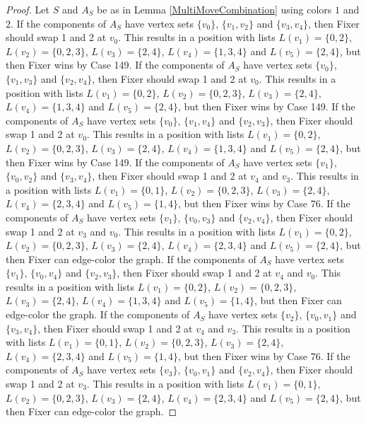 \documentclass[12pt]{amsart}
\theoremstyle{plain}
\theoremstyle{definition}
\theoremstyle{remark}
\begin{document}
\begin{proof}
Let $S$ and $A_S$ be as in Lemma \ref{MultiMoveCombination} using colors $1$ and $2$. If the components of $A_S$ have vertex sets $\{v_0\}$, $\{v_1, v_2\}$ and $\{v_3, v_4\}$, then Fixer should swap 1 and 2 at $v_0$. This results in a position with lists $L(v_1) = \{0, 2\}$, $L(v_2) = \{0, 2, 3\}$, $L(v_3) = \{2, 4\}$, $L(v_4) = \{1, 3, 4\}$ and $L(v_5) = \{2, 4\}$, but then Fixer wins by Case 149.
If the components of $A_S$ have vertex sets $\{v_0\}$, $\{v_1, v_3\}$ and $\{v_2, v_4\}$, then Fixer should swap 1 and 2 at $v_0$. This results in a position with lists $L(v_1) = \{0, 2\}$, $L(v_2) = \{0, 2, 3\}$, $L(v_3) = \{2, 4\}$, $L(v_4) = \{1, 3, 4\}$ and $L(v_5) = \{2, 4\}$, but then Fixer wins by Case 149.
If the components of $A_S$ have vertex sets $\{v_0\}$, $\{v_1, v_4\}$ and $\{v_2, v_3\}$, then Fixer should swap 1 and 2 at $v_0$. This results in a position with lists $L(v_1) = \{0, 2\}$, $L(v_2) = \{0, 2, 3\}$, $L(v_3) = \{2, 4\}$, $L(v_4) = \{1, 3, 4\}$ and $L(v_5) = \{2, 4\}$, but then Fixer wins by Case 149.
If the components of $A_S$ have vertex sets $\{v_1\}$, $\{v_0, v_2\}$ and $\{v_3, v_4\}$, then Fixer should swap 1 and 2 at $v_4$ and $v_3$. This results in a position with lists $L(v_1) = \{0, 1\}$, $L(v_2) = \{0, 2, 3\}$, $L(v_3) = \{2, 4\}$, $L(v_4) = \{2, 3, 4\}$ and $L(v_5) = \{1, 4\}$, but then Fixer wins by Case 76.
If the components of $A_S$ have vertex sets $\{v_1\}$, $\{v_0, v_3\}$ and $\{v_2, v_4\}$, then Fixer should swap 1 and 2 at $v_3$ and $v_0$. This results in a position with lists $L(v_1) = \{0, 2\}$, $L(v_2) = \{0, 2, 3\}$, $L(v_3) = \{2, 4\}$, $L(v_4) = \{2, 3, 4\}$ and $L(v_5) = \{2, 4\}$, but then Fixer can edge-color the graph.
If the components of $A_S$ have vertex sets $\{v_1\}$, $\{v_0, v_4\}$ and $\{v_2, v_3\}$, then Fixer should swap 1 and 2 at $v_4$ and $v_0$. This results in a position with lists $L(v_1) = \{0, 2\}$, $L(v_2) = \{0, 2, 3\}$, $L(v_3) = \{2, 4\}$, $L(v_4) = \{1, 3, 4\}$ and $L(v_5) = \{1, 4\}$, but then Fixer can edge-color the graph.
If the components of $A_S$ have vertex sets $\{v_2\}$, $\{v_0, v_1\}$ and $\{v_3, v_4\}$, then Fixer should swap 1 and 2 at $v_4$ and $v_3$. This results in a position with lists $L(v_1) = \{0, 1\}$, $L(v_2) = \{0, 2, 3\}$, $L(v_3) = \{2, 4\}$, $L(v_4) = \{2, 3, 4\}$ and $L(v_5) = \{1, 4\}$, but then Fixer wins by Case 76.
If the components of $A_S$ have vertex sets $\{v_3\}$, $\{v_0, v_1\}$ and $\{v_2, v_4\}$, then Fixer should swap 1 and 2 at $v_3$. This results in a position with lists $L(v_1) = \{0, 1\}$, $L(v_2) = \{0, 2, 3\}$, $L(v_3) = \{2, 4\}$, $L(v_4) = \{2, 3, 4\}$ and $L(v_5) = \{2, 4\}$, but then Fixer can edge-color the graph.

\end{proof}
\end{document}
